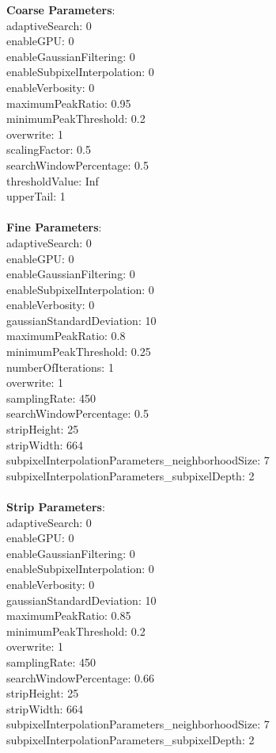 \documentclass[11pt]{article}
\begin{document}
\textbf{Coarse Parameters}: \\
adaptiveSearch: 0\\
enableGPU: 0\\
enableGaussianFiltering: 0\\
enableSubpixelInterpolation: 0\\
enableVerbosity: 0\\
maximumPeakRatio: 0.95\\
minimumPeakThreshold: 0.2\\
overwrite: 1\\
scalingFactor: 0.5\\
searchWindowPercentage: 0.5\\
thresholdValue: Inf\\
upperTail: 1\\
\\
\textbf{Fine Parameters}: \\
adaptiveSearch: 0\\
enableGPU: 0\\
enableGaussianFiltering: 0\\
enableSubpixelInterpolation: 0\\
enableVerbosity: 0\\
gaussianStandardDeviation: 10\\
maximumPeakRatio: 0.8\\
minimumPeakThreshold: 0.25\\
numberOfIterations: 1\\
overwrite: 1\\
samplingRate: 450\\
searchWindowPercentage: 0.5\\
stripHeight: 25\\
stripWidth: 664\\
subpixelInterpolationParameters\_neighborhoodSize: 7\\
subpixelInterpolationParameters\_subpixelDepth: 2\\
\\
\textbf{Strip Parameters}: \\
adaptiveSearch: 0\\
enableGPU: 0\\
enableGaussianFiltering: 0\\
enableSubpixelInterpolation: 0\\
enableVerbosity: 0\\
gaussianStandardDeviation: 10\\
maximumPeakRatio: 0.85\\
minimumPeakThreshold: 0.2\\
overwrite: 1\\
samplingRate: 450\\
searchWindowPercentage: 0.66\\
stripHeight: 25\\
stripWidth: 664\\
subpixelInterpolationParameters\_neighborhoodSize: 7\\
subpixelInterpolationParameters\_subpixelDepth: 2\\
\\
\newpage
\end{document}
